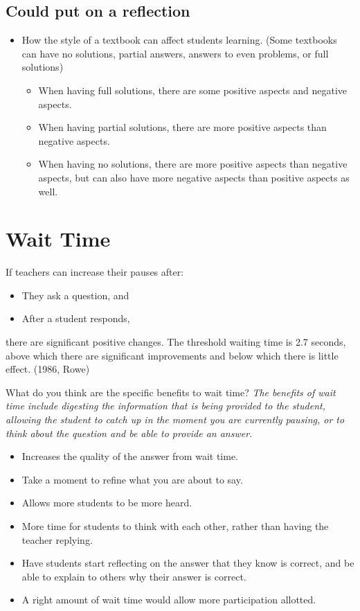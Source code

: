 \documentclass[11pt]{amsart}
\begin{document}
\subsection{Could put on a reflection}

\begin{itemize}
    \item How the style of a textbook can affect students learning. (Some textbooks can have no solutions, partial answers, answers to even problems, or full solutions)
    \begin{itemize}
        \item When having full solutions, there are some positive aspects and negative aspects.
        \item When having partial solutions, there are more positive aspects than negative aspects.
        \item When having no solutions, there are more positive aspects than negative aspects, but can also have more negative aspects than positive aspects as well.
    \end{itemize}
\end{itemize}

\section{Wait Time}

If teachers can increase their pauses after:
\begin{itemize}
    \item They ask a question, and
    \item After a student responds,
\end{itemize}
there are significant positive changes. The threshold waiting time is 2.7 seconds, above which there are significant improvements and below which there is little effect. (1986, Rowe)

What do you think are the specific benefits to wait time? \emph{The benefits of wait time include digesting the information that is being provided to the student, allowing the student to catch up in the moment you are currently pausing, or to think about the question and be able to provide an answer.}
\begin{itemize}
    \item Increases the quality of the answer from wait time.
    \item Take a moment to refine what you are about to say.
    \item Allows more students to be more heard.
    \item More time for students to think with each other, rather than having the teacher replying.
    \item Have students start reflecting on the answer that they know is correct, and be able to explain to others why their answer is correct.
    \item A right amount of wait time would allow more participation allotted.
\end{itemize}
\end{document}
